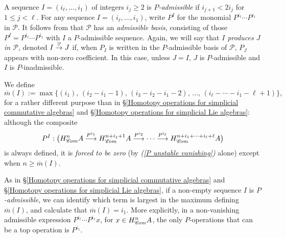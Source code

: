 \documentclass[11pt]{amsart} \renewcommand{\baselinestretch}{1.2}
\theoremstyle{plain}
\newtheorem{lem}[thm]{Lemma}
\numberwithin{equation}{section} %
\theoremstyle{plain}
\newtheorem{lem}[thm]{Lemma}
\numberwithin{equation}{chapter} %
\renewcommand{\to}{\longrightarrow}
\newcommand{\scrC}{\mathscr{C}}
\newcommand{\calP}{\mathcal{P}}
\newcommand{\Palg}{{\calP}}
\newcommand{\minDimP}{\overline{m}}
\newcommand{\minDimDelta}{m}
\newcommand{\produces}[3]{#3:#1\sim #2}
\renewcommand{\produces}[3]{#1\rightarrow_{#3} #2}%
\renewcommand{\produces}[3]{#1\overset{\smash{#3}}{\rightarrow} #2}%
\newcommand{\algs}{{\scrC\!\textit{\normalfont\textit{om}}}}
\begin{document}
\begin{Constructing cohomology operations}
A sequence $I=(i_\ell,\ldots,i_1)$ of integers $i_j\geq2$ is \emph{$P$-admissible} if $i_{j+1}<2i_j$ for $1\leq j <\ell$. For any sequence $I=(i_\ell,\ldots,i_1)$, write $P^I$ for the monomial $P^{i_\ell}\cdots P^{i_1}$ in $\Palg$. It follows from \cite[Theorem I]{MR1089001} that $\Palg$ has an \emph{admissible basis}, consisting of those $P^I=P^{i_\ell}\cdots P^{i_{1}}$ with $I$ a $P$-admissible sequence.  Again, we will say that \emph{$I$ produces $J$ in $\Palg$}, denoted $\produces{I}{J}{\Palg}$ if, when $P_I$ is written in the $P$-admissible basis of $\Palg$, $P_J$ appears with non-zero coefficient. In this case, unless $J=I$, $J$ is $P$-admissible and $I$ is $P$-inadmissible.

We define
\[\minDimP(I):=\max\{(i_1),\,(i_2-i_1-1),\,(i_3-i_2-i_1-2),\,\ldots,\,(i_{\ell}-\cdots-i_1-\ell+1)\},\]
for a rather different purpose than in \S\ref{Homotopy operations for simplicial commutative algebras} and \S\ref{Homotopy operations for simplicial Lie algebras}: although the composite 
\[P^I:\bigl(H_{\algs}^{n}A\overset{P^{i_1}}{\to}H_{\algs}^{n+i_1+1}A\overset{P^{i_2}}{\to}\cdots \overset{P^{i_\ell}}{\to}H_{\algs}^{n+i_1+\cdots +i_\ell+\ell}A\bigr)\]
is always defined, it is \emph{forced to be zero} (by \emph{(\ref{P unstable vanishing})} alone) except  when $n\geq\minDimP(I)$.

As in \S\ref{Homotopy operations for simplicial commutative algebras} and \S\ref{Homotopy operations for simplicial Lie algebras}, if a non-empty sequence $I$  is \emph{$P$-admissible}, we can identify which term is largest in the maximum defining $\minDimP(I)$, and calculate that $\minDimP(I)=i_1$. More explicitly, in a non-vanishing admissible expression $P^{i_\ell}\cdots P^{i_1}x$, for $x\in H^n_{\algs}A$, the only $P$-operations that can be a top operation is $P^{i_{1}}$.




\end{Constructing cohomology operations}
\end{document}
